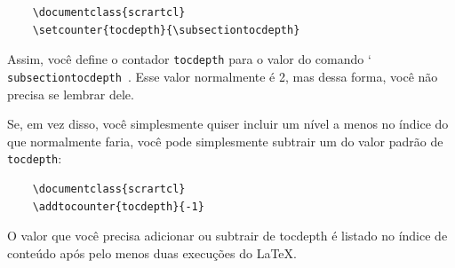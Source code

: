 \begin{verbatim}
    \documentclass{scrartcl}
    \setcounter{tocdepth}{\subsectiontocdepth}
\end{verbatim}

Assim, você define o contador \verb|tocdepth| para o valor do comando \char`\\\texttt{sub\-sec\-tion\-toc\-depth }. Esse valor normalmente é 2, mas dessa forma, você não precisa se lembrar dele.

Se, em vez disso, você simplesmente quiser incluir um nível a menos no índice do que normalmente faria, você pode simplesmente subtrair um do valor padrão de \verb|tocdepth|:
\begin{verbatim}
    \documentclass{scrartcl}
    \addtocounter{tocdepth}{-1}
\end{verbatim}

O valor que você precisa adicionar ou subtrair de tocdepth é listado no índice de conteúdo após pelo menos duas execuções do \LaTeX.

